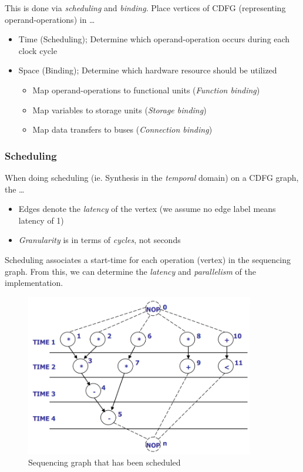 \documentclass{article}
\begin{document}
This is done via \textit{scheduling} and \textit{binding}. 
Place vertices of CDFG (representing operand-operations) in \dots
\begin{itemize}
    \item Time (Scheduling); Determine which operand-operation occurs during each clock cycle 
    \item Space (Binding); Determine which hardware resource should be utilized 
        \begin{itemize}
            \item Map operand-operations to functional units (\textit{Function binding})
            \item Map variables to storage units (\textit{Storage binding})
            \item Map data transfers to buses (\textit{Connection binding})
        \end{itemize}
\end{itemize}

\newpage
\subsubsection{Scheduling}
When doing scheduling (ie. Synthesis in the \textit{temporal} domain) on a CDFG graph, the \dots
\begin{itemize}
    \item Edges denote the \textit{latency} of the vertex (we assume no edge label means latency of 1)
    \item \textit{Granularity} is in terms of \textit{cycles}, not seconds
\end{itemize}

Scheduling associates a start-time for each operation (vertex) in the sequencing graph.
From this, we can determine the \textit{latency} and \textit{parallelism} of the implementation.

\begin{figure}[htp]
    \centering
    \includegraphics[width=10cm, scale=1]{S2/scheduledSequencingGraph.PNG}
    \caption{Sequencing graph that has been scheduled}
\end{figure}
\end{document}
